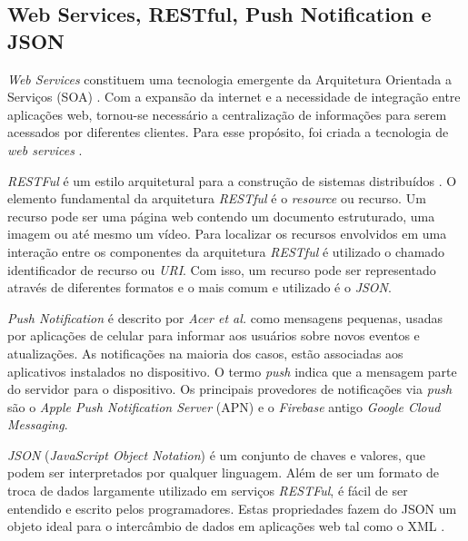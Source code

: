 \subsection{Web Services, RESTful, Push Notification e JSON}
\textit{Web Services} constituem uma tecnologia emergente da Arquitetura Orientada a Serviços (SOA) \cite{perepletchikov}. Com a expansão da internet e a necessidade de integração entre aplicações web, tornou-se necessário a centralização de informações para serem acessados por diferentes clientes. Para esse propósito, foi criada a tecnologia de \textit{web services} \cite{ibm_research}. 

\textit{RESTFul} é um estilo arquitetural para a construção de sistemas distribuídos \cite{fielding}. O elemento fundamental da arquitetura \textit{RESTful} é o \textit{resource} ou recurso. Um recurso pode ser uma página web contendo um documento estruturado, uma imagem ou até mesmo um vídeo. Para localizar os recursos envolvidos em uma interação entre os componentes da arquitetura \textit{RESTful} é utilizado o chamado identificador de recurso ou \textit{URI}. Com isso, um recurso pode ser representado através de diferentes formatos e o mais comum e utilizado é o \textit{JSON}.


\textit{Push Notification} é descrito por \textit{Acer et al.} \cite{Acer:2015:EES:2902314.2902344} como mensagens pequenas, usadas por aplicações de celular para informar aos usuários sobre novos eventos e atualizações. As notificações na maioria dos casos, estão associadas aos aplicativos instalados no dispositivo. O termo \textit{push} indica que a mensagem parte do servidor para o dispositivo. Os principais provedores de notificações via \textit{push} são o \textit{Apple Push Notification Server} (APN) e o \textit{Firebase} antigo \textit{Google Cloud Messaging}.


\textit{JSON} (\textit{JavaScript Object Notation}) é um conjunto de chaves e valores, que podem
ser interpretados por qualquer linguagem. Além de ser um formato de troca de dados largamente utilizado em serviços \textit{RESTFul}, é fácil de ser entendido e escrito pelos programadores. Estas propriedades fazem do JSON um objeto ideal para o intercâmbio de dados em aplicações web tal como o XML \cite{jun_y_zhishu}.